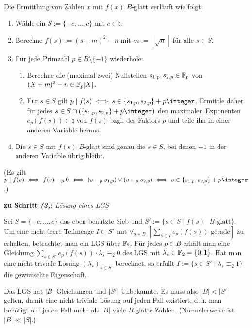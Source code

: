 Die Ermittlung von Zahlen $x$ mit $f(x)$ $B$-glatt verläuft wie folgt:
\begin{enumerate}
    \item
    Wähle ein  $S := \{-c, \dotsc, c\}$ mit $c \in \natural$.

    \item
    Berechne $f(s) := (s + m)^2 - n$ mit $m := \left\lfloor\sqrt{n}\right\rfloor$
    für alle $s \in S$.

    \item
    Für jede Primzahl $p \in B \setminus \{-1\}$ wiederhole:
    \begin{enumerate}
        \item
        Berechne die (maximal zwei) Nullstellen $s_{1,p}, s_{2,p} \in \mathbb{F}_p$ von
        $(X + m)^2 - n \in \mathbb{F}_p[X]$.

        \item
        Für $s \in S$ gilt $p \teilt f(s) \iff s \in \{s_{1,p}, s_{2,p}\} + p\integer$.
        Ermittle daher für jedes $s \in S \cap (\{s_{1,p}, s_{2,p}\} + p\integer)$ den maximalen
        Exponenten $e_p(f(s)) \in \natural$ von $f(s)$ bzgl. des Faktors $p$
        und teile ihn in einer anderen Variable heraus.
    \end{enumerate}

    \item
    Die $s \in S$ mit $f(s)$ $B$-glatt sind genau die $s \in S$, bei denen $\pm 1$ in der
    anderen Variable übrig bleibt.
\end{enumerate}
(Es gilt $p \teilt f(s) \iff f(s) \equiv_p 0 \iff (s \equiv_p s_{1,p}) \lor (s \equiv_p s_{2,p})
\iff s \in \{s_{1,p}, s_{2,p}\} + p\integer$.)

\linie
\pagebreak

\textbf{zu Schritt \emph{(3)}}:
\emph{Lösung eines LGS}

Sei $S = \{-c, \dotsc, c\}$ das eben benutzte Sieb und
$S' := \{s \in S \;|\; f(s) \text{ $B$-glatt}\}$.
Um eine nicht-leere Teilmenge $I \subset S'$ mit
$\forall_{p \in B}\; [\sum_{s \in I} e_p(f(s)) \text{ gerade}]$
zu erhalten, betrachtet man ein LGS über $\mathbb{F}_2$.
Für jedes $p \in B$ erhält man eine Gleichung
$\sum_{s \in S'} e_p(f(s)) \cdot \lambda_s \equiv_2 0$ des LGS
mit $\lambda_s \in \mathbb{F}_2 = \{0, 1\}$.
Hat man eine nicht-triviale Lösung $(\lambda_s)_{s \in S'}$ berechnet, so erfüllt
$I := \{s \in S' \;|\; \lambda_s \equiv_2 1\}$ die gewünschte Eigenschaft.

Das LGS hat $|B|$ Gleichungen und $|S'|$ Unbekannte.
Es muss also $|B| < |S'|$ gelten, damit eine nicht-triviale Lösung auf jeden Fall existiert,
d.\,h. man benötigt auf jeden Fall mehr als $|B|$-viele $B$-glatte Zahlen.
(Normalerweise ist $|B| \ll |S|$.)

